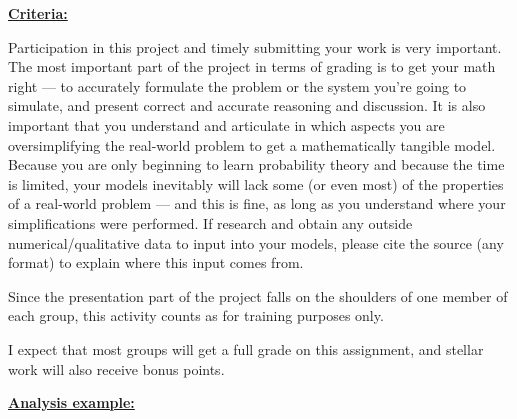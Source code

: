 \documentclass[oneside,11pt]{amsart}
\newcommand{\razdel}[1]{\smallskip\underline{\textbf{#1:}}\smallskip}
\begin{document}
\razdel{Criteria}

Participation in this project and timely submitting your work is very important. 
The most important part of the project in terms of grading is to get your math 
right --- to accurately formulate the problem or the system you're going to simulate,
and present correct and accurate reasoning and discussion.
It is also important that you understand and articulate in which aspects you are oversimplifying
the real-world problem to get a mathematically tangible model.
Because you are only beginning to learn probability theory
and because the time is limited, your models inevitably will lack some (or even most) of the 
properties of a real-world problem --- and this is fine, as long as 
you understand where your simplifications were performed.
If research and obtain 
any outside numerical/qualitative data to input into your models, 
please cite the source (any format) 
to explain where this input comes from.

Since the presentation part of the project falls on the shoulders of one member of each 
group, this activity counts as for training purposes only.

I expect that most groups will get a full grade on this assignment,
and stellar work will also receive bonus points.

\razdel{Analysis example} 
\end{document}
